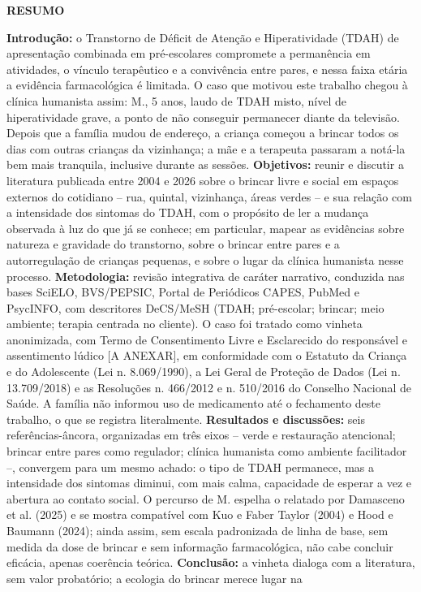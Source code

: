 \begin{center}
{\bfseries RESUMO}
\end{center}

\noindent\textbf{Introdu\c{c}\~ao:} o Transtorno de D\'eficit de Aten\c{c}\~ao e Hiperatividade (TDAH) de apresenta\c{c}\~ao combinada em pr\'e-escolares compromete a perman\^encia em atividades, o v\'inculo terap\^eutico e a conviv\^encia entre pares, e nessa faixa et\'aria a evid\^encia farmacol\'ogica \'e limitada. O caso que motivou este trabalho chegou \`a cl\'inica humanista assim: M., 5 anos, laudo de TDAH misto, n\'ivel de hiperatividade grave, a ponto de n\~ao conseguir permanecer diante da televis\~ao. Depois que a fam\'ilia mudou de endere\c{c}o, a crian\c{c}a come\c{c}ou a brincar todos os dias com outras crian\c{c}as da vizinhan\c{c}a; a m\~ae e a terapeuta passaram a not\'a-la bem mais tranquila, inclusive durante as sess\~oes. \textbf{Objetivos:} reunir e discutir a literatura publicada entre 2004 e 2026 sobre o brincar livre e social em espa\c{c}os externos do cotidiano -- rua, quintal, vizinhan\c{c}a, \'areas verdes -- e sua rela\c{c}\~ao com a intensidade dos sintomas do TDAH, com o prop\'osito de ler a mudan\c{c}a observada \`a luz do que j\'a se conhece; em particular, mapear as evid\^encias sobre natureza e gravidade do transtorno, sobre o brincar entre pares e a autorregula\c{c}\~ao de crian\c{c}as pequenas, e sobre o lugar da cl\'inica humanista nesse processo. \textbf{Metodologia:} revis\~ao integrativa de car\'ater narrativo, conduzida nas bases SciELO, BVS/PEPSIC, Portal de Peri\'odicos CAPES, PubMed e PsycINFO, com descritores DeCS/MeSH (TDAH; pr\'e-escolar; brincar; meio ambiente; terapia centrada no cliente). O caso foi tratado como vinheta anonimizada, com Termo de Consentimento Livre e Esclarecido do respons\'avel e assentimento l\'udico [A ANEXAR], em conformidade com o Estatuto da Crian\c{c}a e do Adolescente (Lei n. 8.069/1990), a Lei Geral de Prote\c{c}\~ao de Dados (Lei n. 13.709/2018) e as Resolu\c{c}\~oes n. 466/2012 e n. 510/2016 do Conselho Nacional de Sa\'ude. A fam\'ilia n\~ao informou uso de medicamento at\'e o fechamento deste trabalho, o que se registra literalmente. \textbf{Resultados e discuss\~oes:} seis refer\^encias-\^ancora, organizadas em tr\^es eixos -- verde e restaura\c{c}\~ao atencional; brincar entre pares como regulador; cl\'inica humanista como ambiente facilitador --, convergem para um mesmo achado: o tipo de TDAH permanece, mas a intensidade dos sintomas diminui, com mais calma, capacidade de esperar a vez e abertura ao contato social. O percurso de M. espelha o relatado por Damasceno et al. (2025) e se mostra compat\'ivel com Kuo e Faber Taylor (2004) e Hood e Baumann (2024); ainda assim, sem escala padronizada de linha de base, sem medida da dose de brincar e sem informa\c{c}\~ao farmacol\'ogica, n\~ao cabe concluir efic\'acia, apenas coer\^encia te\'orica. \textbf{Conclus\~ao:} a vinheta dialoga com a literatura, sem valor probat\'orio; a ecologia do brincar merece lugar na 